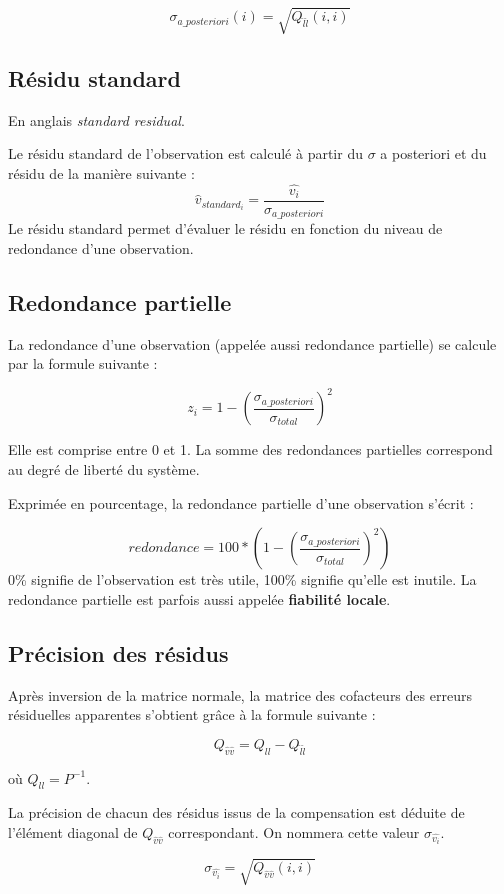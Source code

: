 \documentclass[french]{report}
\begin{document}
$$\sigma_{a\_posteriori}(i)=\sqrt{Q_{\hat{l}\hat{l}}(i,i)}$$


\subsection{Résidu standard}

En anglais \textit{standard residual}.

Le résidu standard de l'observation est calculé à partir du $\sigma$ a posteriori et du résidu de la manière suivante : $$\hat{v}_{standard_i}=\frac{\hat{v_i}}{\sigma_{a\_posteriori}}$$
Le résidu standard permet d'évaluer le résidu en fonction du niveau de redondance d'une observation.


\subsection{Redondance partielle}
La redondance d'une observation (appelée aussi redondance partielle) se calcule par la formule suivante :

$$z_i=1-\left(\frac{\sigma_{a\_posteriori}}{\sigma_{total}}\right)^2$$

Elle est comprise entre 0 et 1. La somme des redondances partielles correspond au degré de liberté du système.

Exprimée en pourcentage, la redondance partielle d'une observation s'écrit :

$$redondance = 100*\left(1-\left(\frac{\sigma_{a\_posteriori}}{\sigma_{total}}\right)^2\right)$$
0\% signifie de l'observation est très utile, 100\% signifie qu'elle est inutile.
La redondance partielle est parfois aussi appelée \textbf{fiabilité locale}.


\subsection{Précision des résidus}

Après inversion de la matrice normale, la matrice des cofacteurs des erreurs résiduelles apparentes s'obtient grâce à la formule suivante :

$$ Q_{\hat{v}\hat{v}} = Q_{ll} - Q_{\hat{l}\hat{l}}$$

où $Q_{ll} = P^{-1}$.

La précision de chacun des résidus issus de la compensation est déduite de l'élément diagonal de $ Q_{\hat{v}\hat{v}} $ correspondant. On nommera cette valeur
$\sigma_{\hat{v_i}}$.

$$\sigma_{\hat{v_i}}=\sqrt{Q_{\hat{v}\hat{v}}(i,i)}$$
\end{document}
